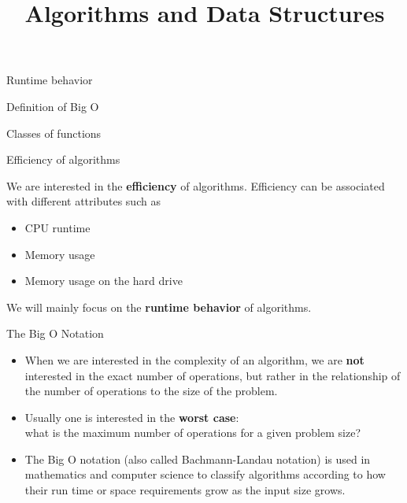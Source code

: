\documentclass[11pt,compress,t,notes=noshow, xcolor=table]{beamer}
\title{Algorithms and Data Structures}
\begin{document}
{
  \item Runtime behavior
  \item Definition of Big O
  \item Classes of functions
}


\begin{vbframe}{Efficiency of algorithms}

We are interested in the \textbf{efficiency} of algorithms. Efficiency can be associated with different attributes such as
  \begin{itemize}
    \item CPU runtime
    \item Memory usage
    \item Memory usage on the hard drive
  \end{itemize}

\lz

We will mainly focus on the \textbf{runtime behavior} of algorithms.

\end{vbframe}

\begin{vbframe}{The Big O Notation}

\begin{itemize}
\item When we are interested in the complexity of an algorithm, we are \textbf{not} interested in the exact number of operations, but rather in the relationship of the number of operations to the size of the problem.
  \item Usually one is interested in the \textbf{worst case}:\\
  what is the maximum number of operations for a given problem size?
  \item The Big O notation (also called Bachmann-Landau notation) is used in mathematics
  and computer science to classify algorithms according to how their run time or space requirements grow as the input size grows.
\end{itemize}


\end{vbframe}
\end{document}
